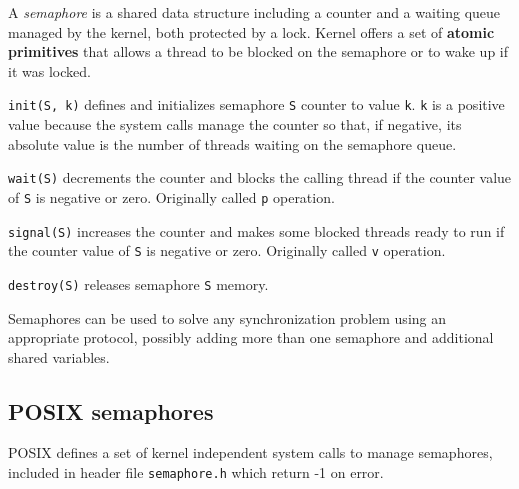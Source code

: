A \emph{semaphore} is a shared data structure including a counter and a waiting queue managed by the kernel, both protected by a lock.
Kernel offers a set of \textbf{atomic primitives} that allows a thread to be blocked on the semaphore or to wake up if it was locked.

\begin{description}
\item \texttt{init(S, k)} defines and initializes semaphore \texttt{S} counter to value \texttt{k}. \texttt{k} is a positive value because the system calls manage the counter so that, if negative, its absolute value is the number of threads waiting on the semaphore queue.
\item \texttt{wait(S)} decrements the counter and blocks the calling thread if the counter value of \texttt{S} is negative or zero. Originally called \texttt{p} operation.
\item \texttt{signal(S)} increases the counter and makes some blocked threads ready to run if the counter value of \texttt{S} is negative or zero. Originally called \texttt{v} operation.
\item \texttt{destroy(S)} releases semaphore \texttt{S} memory.
\end{description}

Semaphores can be used to solve any synchronization problem using an appropriate protocol, possibly adding more than one semaphore and additional shared variables.

\subsection{POSIX semaphores}
POSIX defines a set of kernel independent system calls to manage semaphores, included in header file \texttt{semaphore.h} which return -1 on error.

